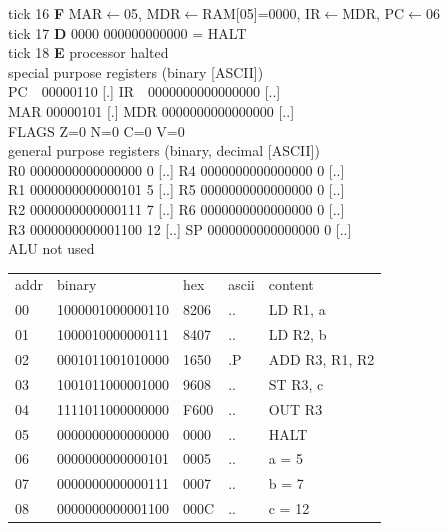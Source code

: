 \begin{tcolorbox}[stepbox, title={Instruction 5 \hfill ticks 13 to 15 \quad OUT R3}]
{\begin{tabular}{@{}lllll@{}}
\end{tabular}}
\end{tcolorbox}\hfill\begin{tcolorbox}[stepbox, title={Instruction 6 \hfill ticks 16 to 18 \quad HALT}]
\textcolor{dim}{tick 16} \textbf{F} MAR$\leftarrow$05, MDR$\leftarrow$RAM[05]=0000, IR$\leftarrow$MDR, PC$\leftarrow$06\\
\textcolor{dim}{tick 17} \textbf{D} 0000 000000000000 = HALT\\
\textcolor{dim}{tick 18} \textbf{E} processor halted\\[2pt]
\textcolor{dim}{special purpose registers (binary [ASCII])}\\
PC~~00000110 [.] \hfill IR~~0000000000000000 [..]\\
MAR 00000101 [.] \hfill MDR 0000000000000000 [..]\\
FLAGS Z=0 N=0 C=0 V=0\\[2pt]
\textcolor{dim}{general purpose registers (binary, decimal [ASCII])}\\
R0 0000000000000000 0 [..] \hfill R4 0000000000000000 0 [..]\\
R1 0000000000000101 5 [..] \hfill R5 0000000000000000 0 [..]\\
R2 0000000000000111 7 [..] \hfill R6 0000000000000000 0 [..]\\
R3 0000000000001100 12 [..] \hfill SP 0000000000000000 0 [..]\\
\textcolor{dim}{ALU not used}\\[2pt]
{\setlength{\tabcolsep}{2pt}\begin{tabular}{@{}lllll@{}}
\textcolor{dim}{addr} & \textcolor{dim}{binary} & \textcolor{dim}{hex} & \textcolor{dim}{ascii} & \textcolor{dim}{content}\\
00 & 1000001000000110 & 8206 & .. & LD R1, a\\
01 & 1000010000000111 & 8407 & .. & LD R2, b\\
02 & 0001011001010000 & 1650 & .P & ADD R3, R1, R2\\
03 & 1001011000001000 & 9608 & .. & ST R3, c\\
04 & 1111011000000000 & F600 & .. & OUT R3\\
05 & 0000000000000000 & 0000 & .. & HALT\\
\rowcolor{datac}06 & 0000000000000101 & 0005 & .. & a = 5\\
\rowcolor{datac}07 & 0000000000000111 & 0007 & .. & b = 7\\
\rowcolor{datac}08 & 0000000000001100 & 000C & .. & c = 12\\
\end{tabular}}
\end{tcolorbox}\par\vspace{3pt}
